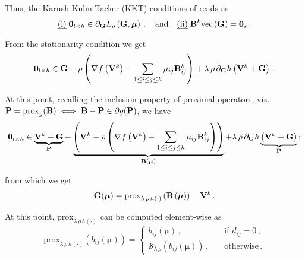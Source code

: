 Thus, the Karush-Kuhn-Tacker (KKT) conditions of  reads as
\begin{equation}\label{eq:ManPGU1_KKT}
    \text{\emph{(i)}}\; \boldsymbol{0}_{l \times h} \in \partial_{\mathbf{G}} L_{\rho}\left(\mathbf{G}, \boldsymbol{\mu} \right)\,, \quad \text{and} \quad \text{\emph{(ii)}}\; \mathbf{B}^k\mathrm{vec}\left(\mathbf{G}\right)=\boldsymbol{0}_{s}\,.
\end{equation}

From the stationarity condition we get
\begin{equation}\label{eq:ManPGU1_stationarity}
    \begin{aligned}
        \boldsymbol{0}_{l \times h} \in \mathbf{G} + \rho \left(\nabla_{} f\left(\mathbf{V}^k\right) - \sum_{1\leq i\leq j\leq h} \mu_{ij} \mathbf{B}^{k}_{ij} \right) + \lambda \, \rho \,\partial_{\mathbf{G}} h\left(\mathbf{V}^k + \mathbf{G}\right)\,.
    \end{aligned}
\end{equation}

At this point, recalling the inclusion property of proximal operators, viz. $\mathbf{P} = \mathrm{prox}_g(\mathbf{B}) \iff \mathbf{B}-\mathbf{P} \in \partial_{} g(\mathbf{P})$, we have
\begin{equation}\label{eq:ManPGU1_stationarity_prox}
    \begin{aligned}
        \boldsymbol{0}_{l \times h} \in \underbrace{\mathbf{V}^k + \mathbf{G}}_{\mathbf{P}} - \underbrace{\left( \mathbf{V}^k - \rho \left(\nabla_{} f\left(\mathbf{V}^k\right) - \sum_{1\leq i\leq j\leq h} \mu_{ij} \mathbf{B}^{k}_{ij} \right) \right)}_{\mathbf{B}(\boldsymbol{\mu})} + \lambda\, \rho \, \partial_{\mathbf{G}} h\underbrace{\left(\mathbf{V}^k + \mathbf{G}\right)}_{\mathbf{P}}\,;
    \end{aligned}
\end{equation}

from which we get
\begin{equation}\label{eq:ManPGU1_stationarity_solved}
    \mathbf{G}(\boldsymbol{\mu}) = \mathrm{prox}_{\lambda \, \rho\, h(\cdot) } \left(\mathbf{B}\left(\boldsymbol{\mu}\right)\right) - \mathbf{V}^k\,.
\end{equation}

At this point, $\mathrm{prox}_{\lambda \, \rho\, h(\cdot) }$ can be computed element-wise as
\begin{equation}\label{eq:ManPGU1_stationarity_prox_solved}
    \mathrm{prox}_{\lambda \, \rho\, h(\cdot) } \left(b_{ij}\left(\boldsymbol{\mu}\right)\right) = \begin{cases}
        b_{ij}(\boldsymbol{\mu})\,, &\quad \text{if } d_{ij}=0\,, \\
        \mathcal{S}_{\lambda \, \rho}(b_{ij}(\boldsymbol{\mu}))\,, &\quad \text{otherwise}\,.
    \end{cases}
\end{equation}

